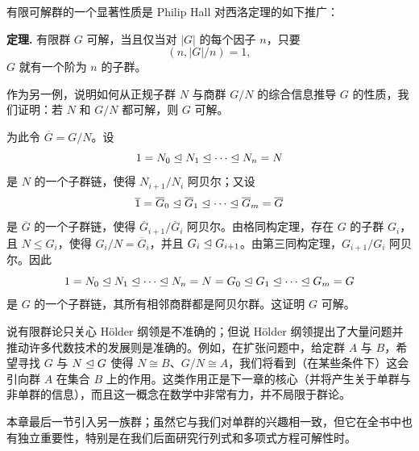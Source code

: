 有限可解群的一个显著性质是 Philip Hall 对西洛定理的如下推广：

\medskip
\noindent\textbf{定理.} 有限群 $G$ 可解，当且仅当对 $|G|$ 的每个因子 $n$，只要
\[
  (n,|G|/n)=1,
\]
$G$ 就有一个阶为 $n$ 的子群。

作为另一例，说明如何从正规子群 $N$ 与商群 $G/N$ 的综合信息推导 $G$ 的性质，我们证明：若 $N$ 和 $G/N$ 都可解，则 $G$ 可解。

为此令 $\overline G=G/N$。设
\[
  1=N_0\trianglelefteq N_1\trianglelefteq\cdots\trianglelefteq N_n=N
\]
是 $N$ 的一个子群链，使得 $N_{i+1}/N_i$ 阿贝尔；又设
\[
  \overline1=\overline G_0\trianglelefteq\overline G_1\trianglelefteq\cdots\trianglelefteq\overline G_m=\overline G
\]
是 $\overline G$ 的一个子群链，使得 $\overline G_{i+1}/\overline G_i$ 阿贝尔。由格同构定理，存在 $G$ 的子群 $G_i$，且 $N\leq G_i$，使得 $G_i/N=\overline G_i$，并且 $G_i\trianglelefteq G_{i+1}$。由第三同构定理，$G_{i+1}/G_i$ 阿贝尔。因此
\[
  1=N_0\trianglelefteq N_1\trianglelefteq\cdots\trianglelefteq N_n=N=G_0\trianglelefteq G_1\trianglelefteq\cdots\trianglelefteq G_m=G
\]
是 $G$ 的一个子群链，其所有相邻商群都是阿贝尔群。这证明 $G$ 可解。

说有限群论只关心 Hölder 纲领是不准确的；但说 Hölder 纲领提出了大量问题并推动许多代数技术的发展则是准确的。例如，在扩张问题中，给定群 $A$ 与 $B$，希望寻找 $G$ 与 $N\trianglelefteq G$ 使得 $N\cong B$、$G/N\cong A$，我们将看到（在某些条件下）这会引向群 $A$ 在集合 $B$ 上的作用。这类作用正是下一章的核心（并将产生关于单群与非单群的信息），而且这一概念在数学中非常有力，并不局限于群论。

本章最后一节引入另一族群；虽然它与我们对单群的兴趣相一致，但它在全书中也有独立重要性，特别是在我们后面研究行列式和多项式方程可解性时。

